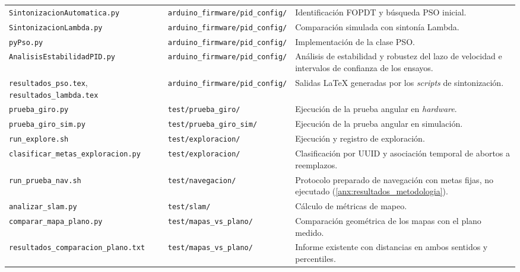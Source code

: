 \begin{appendices}
\begin{longtable}{p{4.5cm} p{4.0cm} p{5.0cm}}
\texttt{SintonizacionAutomatica.\allowbreak{}py} & \texttt{arduino\_\allowbreak{}firmware/\allowbreak{}pid\_\allowbreak{}config/} & Identificación FOPDT y búsqueda PSO inicial. \\
\texttt{SintonizacionLambda.\allowbreak{}py} & \texttt{arduino\_\allowbreak{}firmware/\allowbreak{}pid\_\allowbreak{}config/} & Comparación simulada con sintonía Lambda. \\
\texttt{pyPso.\allowbreak{}py} & \texttt{arduino\_\allowbreak{}firmware/\allowbreak{}pid\_\allowbreak{}config/} & Implementación de la clase PSO. \\
\texttt{AnalisisEstabilidad\allowbreak{}PID.\allowbreak{}py} & \texttt{arduino\_\allowbreak{}firmware/\allowbreak{}pid\_\allowbreak{}config/} & Análisis de estabilidad y robustez del lazo de velocidad e intervalos de confianza de los ensayos. \\
\texttt{resultados\_\allowbreak{}pso.\allowbreak{}tex}, \texttt{resultados\_\allowbreak{}lambda.\allowbreak{}tex} & \texttt{arduino\_\allowbreak{}firmware/\allowbreak{}pid\_\allowbreak{}config/} & Salidas LaTeX generadas por los \textit{scripts} de sintonización. \\
\texttt{prueba\_\allowbreak{}giro.\allowbreak{}py} & \texttt{test/\allowbreak{}prueba\_\allowbreak{}giro/} & Ejecución de la prueba angular en \textit{hardware}. \\
\texttt{prueba\_\allowbreak{}giro\_\allowbreak{}sim.\allowbreak{}py} & \texttt{test/\allowbreak{}prueba\_\allowbreak{}giro\_\allowbreak{}sim/} & Ejecución de la prueba angular en simulación. \\
\texttt{run\_\allowbreak{}explore.\allowbreak{}sh} & \texttt{test/\allowbreak{}exploracion/} & Ejecución y registro de exploración. \\
\texttt{clasificar\_\allowbreak{}metas\_\allowbreak{}exploracion.\allowbreak{}py} & \texttt{test/\allowbreak{}exploracion/} & Clasificación por UUID y asociación temporal de abortos a reemplazos. \\
\texttt{run\_\allowbreak{}prueba\_\allowbreak{}nav.\allowbreak{}sh} & \texttt{test/\allowbreak{}navegacion/} & Protocolo preparado de navegación con metas fijas, no ejecutado (\ref{anx:resultados_metodologia}). \\
\texttt{analizar\_\allowbreak{}slam.\allowbreak{}py} & \texttt{test/\allowbreak{}slam/} & Cálculo de métricas de mapeo. \\
\texttt{comparar\_\allowbreak{}mapa\_\allowbreak{}plano.\allowbreak{}py} & \texttt{test/\allowbreak{}mapas\_\allowbreak{}vs\_\allowbreak{}plano/} & Comparación geométrica de los mapas con el plano medido. \\
\texttt{resultados\_\allowbreak{}comparacion\_\allowbreak{}plano.\allowbreak{}txt} & \texttt{test/\allowbreak{}mapas\_\allowbreak{}vs\_\allowbreak{}plano/} & Informe existente con distancias en ambos sentidos y percentiles. \\
\end{longtable}
\endgroup


\end{appendices}
